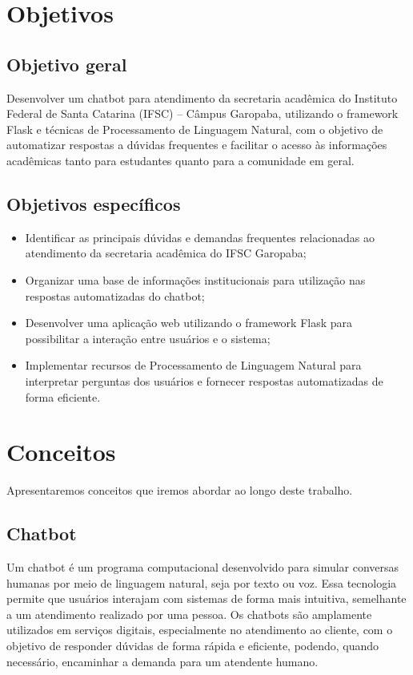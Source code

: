 \documentclass[12pt]{article}
\begin{document}
\section{Objetivos}\label{sec:objetivos}

\subsection{Objetivo geral}

Desenvolver um chatbot para atendimento da secretaria acadêmica do
Instituto Federal de Santa Catarina (IFSC) -- Câmpus Garopaba, utilizando
o framework Flask e técnicas de Processamento de Linguagem Natural, com o
objetivo de automatizar respostas a dúvidas frequentes e facilitar o
acesso às informações acadêmicas tanto para estudantes quanto para a
comunidade em geral.

\subsection{Objetivos específicos}

\begin{itemize}
  \item Identificar as principais dúvidas e demandas frequentes
  relacionadas ao atendimento da secretaria acadêmica do IFSC Garopaba;
  \item Organizar uma base de informações institucionais para utilização
  nas respostas automatizadas do chatbot;
  \item Desenvolver uma aplicação web utilizando o framework Flask para
  possibilitar a interação entre usuários e o sistema;
  \item Implementar recursos de Processamento de Linguagem Natural para
  interpretar perguntas dos usuários e fornecer respostas automatizadas
  de forma eficiente.
\end{itemize}

\section{Conceitos}\label{sec:conceitos}

Apresentaremos conceitos que iremos abordar ao longo deste trabalho.

\subsection{Chatbot}

Um chatbot é um programa computacional desenvolvido para simular
conversas humanas por meio de linguagem natural, seja por texto ou voz.
Essa tecnologia permite que usuários interajam com sistemas de forma mais
intuitiva, semelhante a um atendimento realizado por uma pessoa. Os
chatbots são amplamente utilizados em serviços digitais, especialmente no
atendimento ao cliente, com o objetivo de responder dúvidas de forma
rápida e eficiente, podendo, quando necessário, encaminhar a demanda para
um atendente humano.
\end{document}

